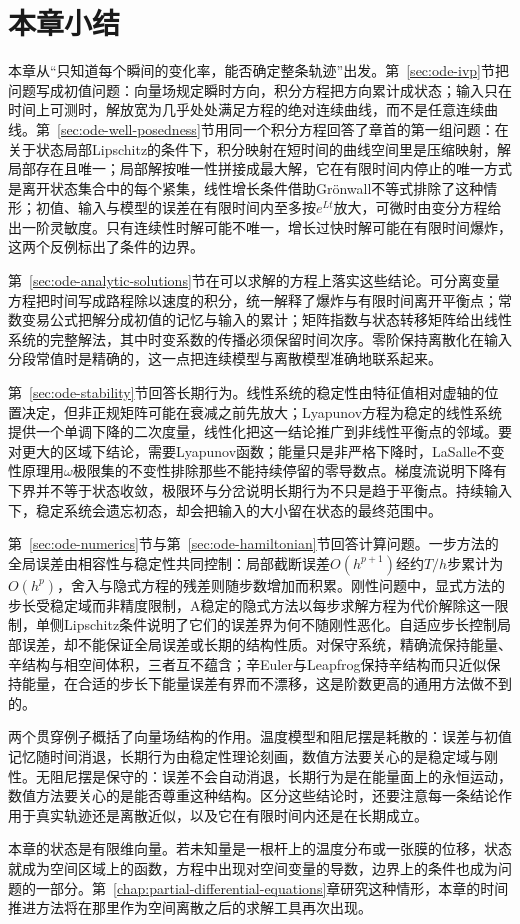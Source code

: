 
\section{本章小结}
\label{sec:ode-summary}

本章从“只知道每个瞬间的变化率，能否确定整条轨迹”出发。第~\ref{sec:ode-ivp}节把问题写成初值问题：向量场规定瞬时方向，积分方程把方向累计成状态；输入只在时间上可测时，解放宽为几乎处处满足方程的绝对连续曲线，而不是任意连续曲线。第~\ref{sec:ode-well-posedness}节用同一个积分方程回答了章首的第一组问题：在关于状态局部Lipschitz的条件下，积分映射在短时间的曲线空间里是压缩映射，解局部存在且唯一；局部解按唯一性拼接成最大解，它在有限时间内停止的唯一方式是离开状态集合中的每个紧集，线性增长条件借助Grönwall不等式排除了这种情形；初值、输入与模型的误差在有限时间内至多按$e^{Lt}$放大，可微时由变分方程给出一阶灵敏度。只有连续性时解可能不唯一，增长过快时解可能在有限时间爆炸，这两个反例标出了条件的边界。

第~\ref{sec:ode-analytic-solutions}节在可以求解的方程上落实这些结论。可分离变量方程把时间写成路程除以速度的积分，统一解释了爆炸与有限时间离开平衡点；常数变易公式把解分成初值的记忆与输入的累计；矩阵指数与状态转移矩阵给出线性系统的完整解法，其中时变系数的传播必须保留时间次序。零阶保持离散化在输入分段常值时是精确的，这一点把连续模型与离散模型准确地联系起来。

第~\ref{sec:ode-stability}节回答长期行为。线性系统的稳定性由特征值相对虚轴的位置决定，但非正规矩阵可能在衰减之前先放大；Lyapunov方程为稳定的线性系统提供一个单调下降的二次度量，线性化把这一结论推广到非线性平衡点的邻域。要对更大的区域下结论，需要Lyapunov函数；能量只是非严格下降时，LaSalle不变性原理用$\omega$极限集的不变性排除那些不能持续停留的零导数点。梯度流说明下降有下界并不等于状态收敛，极限环与分岔说明长期行为不只是趋于平衡点。持续输入下，稳定系统会遗忘初态，却会把输入的大小留在状态的最终范围中。

第~\ref{sec:ode-numerics}节与第~\ref{sec:ode-hamiltonian}节回答计算问题。一步方法的全局误差由相容性与稳定性共同控制：局部截断误差$O(h^{p+1})$经约$T/h$步累计为$O(h^p)$，舍入与隐式方程的残差则随步数增加而积累。刚性问题中，显式方法的步长受稳定域而非精度限制，A稳定的隐式方法以每步求解方程为代价解除这一限制，单侧Lipschitz条件说明了它们的误差界为何不随刚性恶化。自适应步长控制局部误差，却不能保证全局误差或长期的结构性质。对保守系统，精确流保持能量、辛结构与相空间体积，三者互不蕴含；辛Euler与Leapfrog保持辛结构而只近似保持能量，在合适的步长下能量误差有界而不漂移，这是阶数更高的通用方法做不到的。

两个贯穿例子概括了向量场结构的作用。温度模型和阻尼摆是耗散的：误差与初值记忆随时间消退，长期行为由稳定性理论刻画，数值方法要关心的是稳定域与刚性。无阻尼摆是保守的：误差不会自动消退，长期行为是在能量面上的永恒运动，数值方法要关心的是能否尊重这种结构。区分这些结论时，还要注意每一条结论作用于真实轨迹还是离散近似，以及它在有限时间内还是在长期成立。

本章的状态是有限维向量。若未知量是一根杆上的温度分布或一张膜的位移，状态就成为空间区域上的函数，方程中出现对空间变量的导数，边界上的条件也成为问题的一部分。第~\ref{chap:partial-differential-equations}章研究这种情形，本章的时间推进方法将在那里作为空间离散之后的求解工具再次出现。
